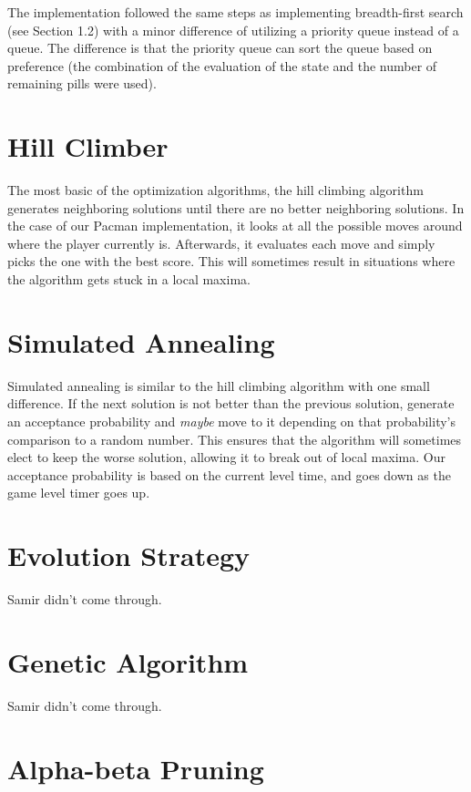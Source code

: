 \documentclass[a4paper,oneside,10pt]{report}
\begin{document}
The implementation followed the same steps as implementing breadth-first search (see Section 1.2) with a minor difference of utilizing a priority queue instead of a queue. The difference is that the priority queue can sort the queue based on preference (the combination of the evaluation of the state and the number of remaining pills were used). 

\section{Hill Climber}\label{hill}

The most basic of the optimization algorithms, the hill climbing algorithm generates neighboring solutions until there are no better neighboring solutions. In the case of our Pacman implementation, it looks at all the possible moves around where the player currently is. Afterwards, it evaluates each move and simply picks the one with the best score. This will sometimes result in situations where the algorithm gets stuck in a local maxima.

\section{Simulated Annealing}\label{sannealing}

Simulated annealing is similar to the hill climbing algorithm with one small difference. If the next solution is not better than the previous solution, generate an acceptance probability and \textit{maybe} move to it depending on that probability's comparison to a random number. This ensures that the algorithm will sometimes elect to keep the worse solution, allowing it to break out of local maxima. Our acceptance probability is based on the current level time, and goes down as the game level timer goes up. 

\section{Evolution Strategy}\label{evolution}

Samir didn't come through.

\section{Genetic Algorithm}\label{genetic}

Samir didn't come through.

\section{Alpha-beta Pruning}\label{alphabeta}
\end{document}
